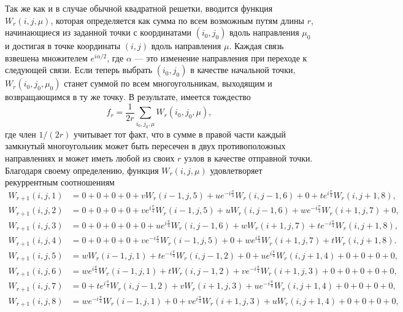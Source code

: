 \documentclass[utf8,12pt]{jetp}
\begin{document}
Так же как и в случае обычной квадратной решетки, вводится функция $W_r(i, j, \mu)$, которая определяется как сумма по всем возможным путям длины $r$, начинающиеся из заданной точки с координатами $(i_0, j_0)$ вдоль направления $\mu_0$ и достигая в точке координаты $(i, j)$ вдоль направления $\mu$. Каждая связь взвешена множителем $e^{i \alpha/2}$, где $\alpha$ --- это изменение направления при переходе к следующей связи. Если теперь выбрать $(i_0, j_0)$ в качестве начальной точки, $W_r(i_0, j_0, \mu_0)$ станет суммой по всем многоугольникам, выходящим и возвращающимся в ту же точку. В результате, имеется тождество
\begin{equation}
	f_r = \frac{1}{2r}\sum_{i_0, j_0, \mu} W_r (i_0, j_0, \mu),
	\label{fr}
\end{equation}
где член $1/(2r)$ учитывает тот факт, что в сумме в правой части каждый замкнутый многоугольник может быть пересечен в двух противоположных направлениях и может иметь любой из своих $r$ узлов в качестве отправной точки. Благодаря своему определению, функция $W_r(i, j, \mu)$ удовлетворяет рекуррентным соотношениям
\begin{align}
	W_{r+1} (i, j, 1) &= 0 + 0 + 0 + 0 + v W_r(i-1,j,5) + u e^{-i\frac{\pi}{4}} W_r(i,j-1,6) + 0 + t e^{i\frac{\pi}{4}} W_r(i,j+1,8),\nonumber\\
	W_{r+1} (i, j, 2) &= 0 + 0 + 0 + 0 + v e^{i\frac{\pi}{4}}W_r(i-1,j,5) + u W_r(i,j-1,6) + w e^{-i\frac{\pi}{4}} W_r(i+1,j,7) + 0,\nonumber\\
	W_{r+1} (i, j, 3) &= 0 + 0 + 0 + 0 + 0 + u e^{i\frac{\pi}{4}} W_r(i,j-1,6) + w W_r(i+1,j,7) + t e^{-i\frac{\pi}{4}} W_r(i,j+1,8),\nonumber\\
	W_{r+1} (i, j, 4) &= 0 + 0 + 0 + 0 + v e^{-i\frac{\pi}{4}} W_r(i-1,j,5) + 0 + w e^{i\frac{\pi}{4}} W_r(i+1,j,7) + t W_r(i,j+1,8).\nonumber\\
	W_{r+1} (i, j, 5) &= w W_r(i-1,j,1) + t e^{-i\frac{\pi}{4}} W_r(i,j-1,2) + 0 + u e^{i\frac{\pi}{4}} W_r(i,j+1,4) + 0 + 0 + 0 + 0, \nonumber\\
	W_{r+1} (i, j, 6) &= w e^{i\frac{\pi}{4}}W_r(i-1,j,1) + t W_r(i,j-1,2) + v e^{-i\frac{\pi}{4}} W_r(i+1,j,3) + 0 + 0 + 0 + 0 + 0,\nonumber\\
	W_{r+1} (i, j, 7) &= 0 + t e^{i\frac{\pi}{4}} W_r(i,j-1,2) + v W_r(i+1,j,3) + u e^{-i\frac{\pi}{4}} W_r(i,j+1,4) + 0 + 0 + 0 + 0,\nonumber\\
	W_{r+1} (i, j, 8) &= w e^{-i\frac{\pi}{4}} W_r(i-1,j,1) + 0 + v e^{i\frac{\pi}{4}} W_r(i+1,j,3) + u W_r(i,j+1,4) + 0 + 0 + 0 + 0,\nonumber\\
	\label{reccursiveW}
\end{align}
\end{document}
